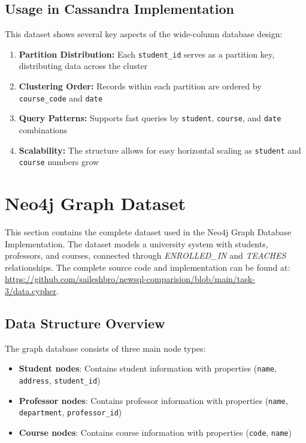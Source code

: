 \subsection{Usage in Cassandra Implementation}

This dataset shows several key aspects of the wide-column database design:

\begin{enumerate}
    \item \textbf{Partition Distribution:} Each \texttt{student\_id} serves as a partition key, distributing data across the cluster
    \item \textbf{Clustering Order:} Records within each partition are ordered by \texttt{course\_code} and \texttt{date}
    \item \textbf{Query Patterns:} Supports fast queries by \texttt{student}, \texttt{course}, and \texttt{date} combinations
    \item \textbf{Scalability:} The structure allows for easy horizontal scaling as \texttt{student} and \texttt{course} numbers grow
\end{enumerate}

\section{Neo4j Graph Dataset}

This section contains the complete dataset used in the Neo4j Graph Database Implementation. The dataset models a university system with students, professors, and courses, connected through \textit{ENROLLED\_IN} and \textit{TEACHES} relationships. The complete source code and implementation can be found at: \url{https://github.com/saileshbro/newsql-comparision/blob/main/task-3/data.cypher}.

\subsection{Data Structure Overview}

The graph database consists of three main node types:
\begin{itemize}
    \item \textbf{Student nodes}: Contains student information with properties (\texttt{name}, \texttt{address}, \texttt{student\_id})
    \item \textbf{Professor nodes}: Contains professor information with properties (\texttt{name}, \texttt{department}, \texttt{professor\_id})
    \item \textbf{Course nodes}: Contains course information with properties (\texttt{code}, \texttt{name})
\end{itemize}

